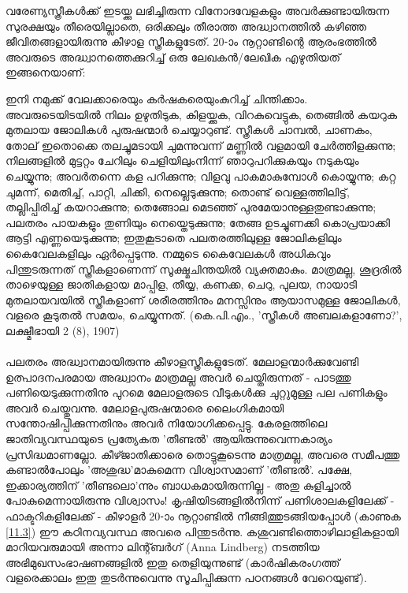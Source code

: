 വരേണ്യസ്ത്രീകൾക്ക് ഇടയ്ക്കു ലഭിച്ചിരുന്ന വിനോദവേളകളും അവർക്കുണ്ടായിരുന്ന സുരക്ഷയും തീരെയില്ലാതെ, ഒരിക്കലും തീരാത്ത അദ്ധ്വാനത്തിൽ കഴിഞ്ഞ ജീവിതങ്ങളായിരുന്നു കീഴാള സ്ത്രീകളുടേത്. 20-ാം നൂറ്റാണ്ടിന്റെ ആരംഭത്തിൽ അവരുടെ അദ്ധ്വാനത്തെക്കുറിച്ച് ഒരു ലേഖകൻ/ലേഖിക എഴുതിയത് ഇങ്ങനെയാണ്:
\begin{tcolorbox}{}
ഇനി നമുക്ക് വേലക്കാരെയും കർഷകരെയുംകുറിച്ച് ചിന്തിക്കാം. അവരുടെയിടയിൽ നിലം ഉഴുതിടുക, കിളയ്ക്കുക, വിറകുവെട്ടുക, തെങ്ങിൽ കയറുക മുതലായ ജോലികൾ പുരുഷന്മാർ ചെയ്യാറുണ്ട്. സ്ത്രീകൾ ചാമ്പൽ, ചാണകം, തോല് ഇതൊക്കെ തലച്ചുമടായി ചുമന്നുവന്ന് മണ്ണിൽ വളമായി ചേർത്തിളക്കുന്നു; നിലങ്ങളിൽ മുട്ടറ്റം ചേറിലും ചെളിയിലുംനിന്ന് ഞാറുപറിക്കുകയും നടുകയും ചെയ്യുന്നു; അവർതന്നെ കള പറിക്കുന്നു; വിളവു പാകമാകുമ്പോൾ കൊയ്യുന്നു; കറ്റ ചുമന്ന്, മെതിച്ച്, പാറ്റി, ചിക്കി, നെല്ലെടുക്കുന്നു; തൊണ്ട് വെള്ളത്തിലിട്ട്, തല്ലിപ്പിരിച്ച് കയറാക്കുന്നു; തെങ്ങോല മെടഞ്ഞ് പുരമേയാനുള്ളതുണ്ടാക്കുന്നു; പലതരം പായകളും തുണിയും നെയ്തെടുക്കുന്നു; തേങ്ങ ഉടച്ചുണക്കി കൊപ്രയാക്കി ആട്ടി എണ്ണയെടുക്കുന്നു; ഇതുകൂടാതെ പലതരത്തിലുള്ള ജോലികളിലും കൈവേലകളിലും ഏർപ്പെടുന്നു. നമ്മുടെ കൈവേലകൾ അധികവും പിന്തുടരുന്നത് സ്ത്രീകളാണെന്ന് സൂക്ഷ്മചിന്തയിൽ വ്യക്തമാകും. മാത്രമല്ല, ശൂദ്രരിൽ താഴെയുള്ള ജാതികളായ മാപ്പിള, തീയ്യ, കണക്ക, ചെറു, പുലയ, നായാടി മുതലായവയിൽ സ്ത്രീകളാണ് ശരീരത്തിനും മനസ്സിനും ആയാസമുള്ള ജോലികൾ, വളരെ കൂടുതൽ സമയം, ചെയ്യുന്നത്.
(കെ.പി.എം., 'സ്ത്രീകൾ അബലകളാണോ?', ലക്ഷ്മീഭായി 2 (8), 1907)
\end{tcolorbox}

\paragraph{} പലതരം അദ്ധ്വാനമായിരുന്നു കീഴാളസ്ത്രീകളുടേത്. മേലാളന്മാർക്കുവേണ്ടി ഉത്പാദനപരമായ അദ്ധ്വാനം മാത്രമല്ല അവർ ചെയ്തിരുന്നത് - പാടത്തു പണിയെടുക്കുന്നതിനു പുറമെ മേലാളരുടെ വീടുകൾക്കു ചുറ്റുമുള്ള പല പണികളും അവർ ചെയ്തുവന്നു. മേലാളപുരുഷന്മാരെ ലൈംഗികമായി സന്തോഷിപ്പിക്കുന്നതിനും അവർ നിയോഗിക്കപ്പെട്ടു. കേരളത്തിലെ ജാതിവ്യവസ്ഥയുടെ പ്രത്യേകത 'തീണ്ടൽ' ആയിരുന്നുവെന്നകാര്യം പ്രസിദ്ധമാണല്ലോ. കീഴ്ജാതിക്കാരെ തൊട്ടുകൂടെന്നു മാത്രമല്ല, അവരെ സമീപത്തു കണ്ടാൽപോലും 'അശുദ്ധ'മാകുമെന്ന വിശ്വാസമാണ് 'തീണ്ടൽ'. പക്ഷേ, ഇക്കാര്യത്തിന് 'തീണ്ടലൊ'ന്നും ബാധകമായിരുന്നില്ല - അതു കുളിച്ചാൽ പോകുമെന്നായിരുന്നു വിശ്വാസം! കൃഷിയിടങ്ങളിൽനിന്ന് പണിശാലകളിലേക്ക് - ഫാക്ടറികളിലേക്ക് - കീഴാളർ 20-ാം നൂറ്റാണ്ടിൽ നീങ്ങിത്തുടങ്ങിയപ്പോൾ (കാണുക \ref{11.3}) ഈ കഠിനവ്യവസ്ഥ അവരെ പിന്തുടർന്നു. കശുവണ്ടിത്തൊഴിലാളികളായി മാറിയവരുമായി അന്നാ ലിന്റ്ബർഗ് (Anna Lindberg) നടത്തിയ അഭിമുഖസംഭാഷണങ്ങളിൽ ഇതു തെളിയുന്നുണ്ട് (കാർഷികരംഗത്ത് വളരെക്കാലം ഇതു തുടർന്നുവെന്നു സൂചിപ്പിക്കുന്ന പഠനങ്ങൾ വേറെയുണ്ട്).
